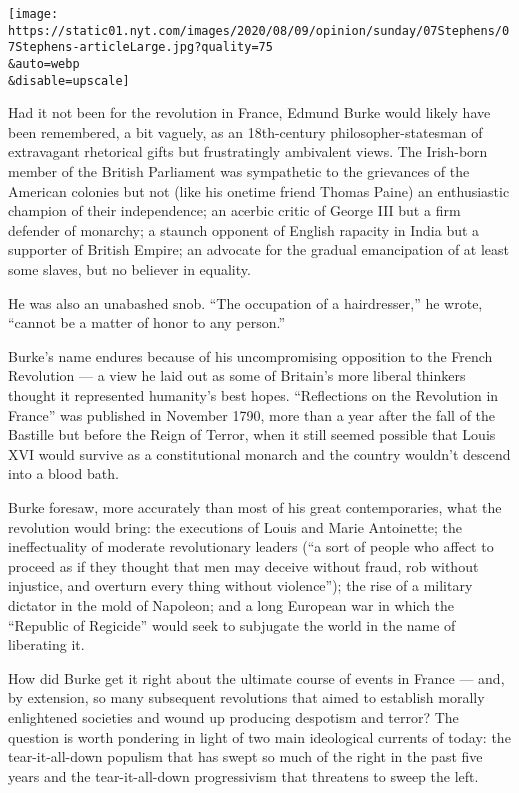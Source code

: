\texttt{[image: https://static01.nyt.com/images/2020/08/09/opinion/sunday/07Stephens/07Stephens-articleLarge.jpg?quality=75\\\&auto=webp\\\&disable=upscale]}

Had it not been for the revolution in France, Edmund Burke would likely
have been remembered, a bit vaguely, as an 18th-century
philosopher-statesman of extravagant rhetorical gifts but frustratingly
ambivalent views. The Irish-born member of the British Parliament was
sympathetic to the grievances of the American colonies but not (like his
onetime friend Thomas Paine) an enthusiastic champion of their
independence; an acerbic critic of George III but a firm defender of
monarchy; a staunch opponent of English rapacity in India but a
supporter of British Empire; an advocate for the gradual emancipation of
at least some slaves, but no believer in equality.

He was also an unabashed snob. ``The occupation of a hairdresser,'' he
wrote, ``cannot be a matter of honor to any person.''

Burke's name endures because of his uncompromising opposition to the
French Revolution --- a view he laid out as some of Britain's more
liberal thinkers thought it represented humanity's best hopes.
``Reflections on the Revolution in France'' was published in November
1790, more than a year after the fall of the Bastille but before the
Reign of Terror, when it still seemed possible that Louis XVI would
survive as a constitutional monarch and the country wouldn't descend
into a blood bath.

Burke foresaw, more accurately than most of his great contemporaries,
what the revolution would bring: the executions of Louis and Marie
Antoinette; the ineffectuality of moderate revolutionary leaders (``a
sort of people who affect to proceed as if they thought that men may
deceive without fraud, rob without injustice, and overturn every thing
without violence''); the rise of a military dictator in the mold of
Napoleon; and a long European war in which the ``Republic of Regicide''
would seek to subjugate the world in the name of liberating it.

How did Burke get it right about the ultimate course of events in France
--- and, by extension, so many subsequent revolutions that aimed to
establish morally enlightened societies and wound up producing despotism
and terror? The question is worth pondering in light of two main
ideological currents of today: the tear-it-all-down populism that has
swept so much of the right in the past five years and the
tear-it-all-down progressivism that threatens to sweep the left.

